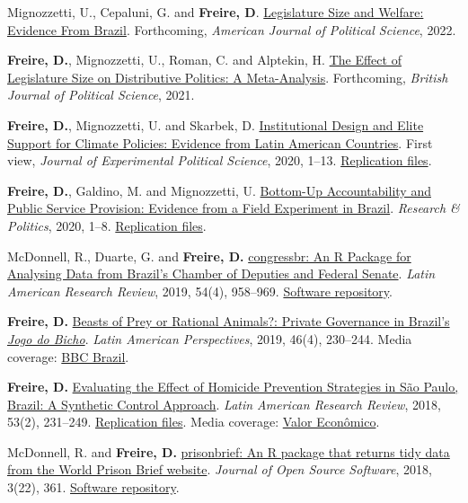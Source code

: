 \documentclass[a4paper]{article}
\renewenvironment{itemize}{
	\begin{list}{}{
			\setlength{\leftmargin}{1.5em}
		}
		}{
	\end{list}
}
\begin{document}
\begin{itemize}
\item Mignozzetti, U., Cepaluni, G. and \textbf{Freire, D}. \href{https://github.com/umbertomig/legislature-size-welfare}{Legislature Size and Welfare: Evidence From Brazil}. Forthcoming, \textit{American Journal of Political Science}, 2022.
\item \textbf{Freire, D.}, Mignozzetti, U., Roman, C. and Alptekin, H. \href{https://doi.org/10.31235/osf.io/xf7wp}{The Effect of Legislature Size on Distributive Politics: A Meta-Analysis}. Forthcoming, \textit{British Journal of Political Science}, 2021.
\item \textbf{Freire, D.}, Mignozzetti, U. and Skarbek, D. \href{http://dx.doi.org/10.1017/XPS.2020.19}{Institutional Design and Elite Support for Climate Policies: Evidence from Latin American Countries}. First view, \textit{Journal of Experimental Political Science}, 2020, 1--13. \href{https://doi.org/10.7910/DVN/VTA5OA}{Replication files}.
\item \textbf{Freire, D.}, Galdino, M. and Mignozzetti, U. \href{https://doi.org/10.1177%2F2053168020914444}{Bottom-Up Accountability and Public Service Provision: Evidence from a Field Experiment in Brazil}. \textit{Research \& Politics}, 2020, 1--8. \href{https://github.com/umbertomig/tdp-accountability}{Replication files}.
\item McDonnell, R., Duarte, G. and \textbf{Freire, D.} \href{https://doi.org/10.25222/larr.447}{congressbr: An R Package for Analysing Data from Brazil's Chamber of Deputies and Federal Senate}. \textit{Latin American Research Review}, 2019, 54(4), 958--969. \href{https://github.com/duarteguilherme/congressbr}{Software repository}.
\item \textbf{Freire, D.} \href{https://doi.org/10.1177/0094582X19846519}{Beasts of Prey or Rational Animals?: Private Governance in Brazil's \emph{Jogo do Bicho}}. \textit{Latin American Perspectives}, 2019, 46(4), 230--244. Media coverage: \href{http://www.bbc.com/portuguese/brasil-40140693}{BBC Brazil}.
\item \textbf{Freire, D.} \href{https://larrlasa.org/articles/10.25222/larr.334/}{Evaluating the Effect of Homicide Prevention Strategies in São Paulo, Brazil: A Synthetic Control Approach}. \textit{Latin American Research Review}, 2018, 53(2), 231--249. \href{https://github.com/danilofreire/homicides-sp-synth}{Replication files}. Media coverage: \href{http://www.valor.com.br/cultura/5111524/sangue-no-asfalto}{Valor Econômico}.
\item McDonnell, R. and \textbf{Freire, D.} \href{https://doi.org/10.21105/joss.00361}{prisonbrief: An R package that returns tidy data from the World Prison Brief website}. \textit{Journal of Open Source Software}, 2018, 3(22), 361. \href{https://github.com/danilofreire/prisonbrief}{Software repository}.

\end{itemize}
\end{document}
